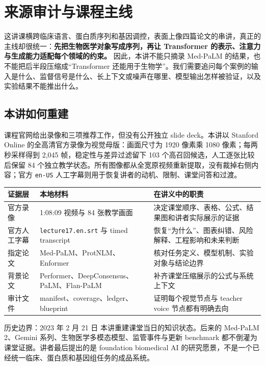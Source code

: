 \section{来源审计与课程主线}

这讲课横跨临床语言、蛋白质序列和基因调控，表面上像四篇论文的串讲，真正的主线却很统一：\textbf{先把生物医学对象写成序列，再让 Transformer 的表示、注意力与生成能力适配每个领域的约束。} 因此，本讲不能只摘录 Med-PaLM 的结果，也不能把后半段压缩成“Transformer 还能用于生物学”。我们需要追问每个案例的输入是什么、监督信号是什么、长上下文或噪声在哪里、模型输出怎样被验证，以及实验结果不能推出什么。

\subsection{本讲如何重建}

课程官网给出录像和三项推荐工作，但没有公开独立 slide deck。本讲以 Stanford Online 的全高清官方录像为视觉母版：画面尺寸为 1920 像素乘 1080 像素；每两秒采样得到 2,045 帧，稳定性与差异过滤留下 103 个高召回候选，人工逐张比较后保留 84 个独立教学状态。所有图像都从全宽原视频重新提取，没有裁掉右侧内容；官方 \texttt{en-US} 人工字幕则用于恢复讲者的动机、限制、课堂问答和过渡。

\begin{longtable}{@{}L{0.18\textwidth}L{0.28\textwidth}L{0.42\textwidth}@{}}
\toprule
证据层 & 本地材料 & 在讲义中的职责 \\
\midrule
官方录像 & 1:08:09 视频与 84 张教学画面 & 决定课堂顺序、表格、公式、结果图和讲者实际展示的证据 \\
官方人工字幕 & \texttt{lecture17.en.srt} 与 timed transcript & 恢复“为什么”、图表纠错、风险解释、工程影响和未来判断 \\
指定论文 & Med-PaLM、ProtNLM、Enformer & 核对任务定义、模型机制、实验对象与结论边界 \\
背景论文 & Performer、DeepConsensus、PaLM、Flan-PaLM & 补齐课堂压缩展示的公式与系统上下文 \\
审计文件 & manifest、coverage、ledger、blueprint & 证明每个视觉节点与 teacher voice 节点都有明确去向 \\
\bottomrule
\end{longtable}

\begin{warningbox}{历史边界：2023 年 2 月 21 日}
本讲重建课堂当日的知识状态。后来的 Med-PaLM 2、Gemini 系列、生物医学多模态模型、监管事件与更新 benchmark 都不倒灌为课堂证据。讲者最后提出的是 foundation biomedical AI 的研究愿景，不是一个已经统一临床、蛋白质和基因组任务的成品系统。
\end{warningbox}

